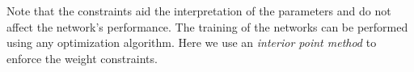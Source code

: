 Note that the constraints aid the interpretation of the parameters and do not affect the network's performance. The training of the networks can be performed using any optimization algorithm. Here we use an \emph{interior point method} \cite{BonnansGilLemSag2006} to enforce the weight constraints. 
%

